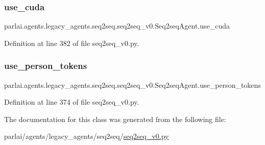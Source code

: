 \subsubsection{\texorpdfstring{use\+\_\+cuda}{use\_cuda}}
{\footnotesize\ttfamily parlai.\+agents.\+legacy\+\_\+agents.\+seq2seq.\+seq2seq\+\_\+v0.\+Seq2seq\+Agent.\+use\+\_\+cuda}



Definition at line 382 of file seq2seq\+\_\+v0.\+py.

\mbox{\label{classparlai_1_1agents_1_1legacy__agents_1_1seq2seq_1_1seq2seq__v0_1_1Seq2seqAgent_a227faa3994686ab266237ce9e11a2dc7}} 
\subsubsection{\texorpdfstring{use\+\_\+person\+\_\+tokens}{use\_person\_tokens}}
{\footnotesize\ttfamily parlai.\+agents.\+legacy\+\_\+agents.\+seq2seq.\+seq2seq\+\_\+v0.\+Seq2seq\+Agent.\+use\+\_\+person\+\_\+tokens}



Definition at line 374 of file seq2seq\+\_\+v0.\+py.



The documentation for this class was generated from the following file\+:\begin{DoxyCompactItemize}
\item 
parlai/agents/legacy\+\_\+agents/seq2seq/\hyperlink{seq2seq__v0_8py}{seq2seq\+\_\+v0.\+py}\end{DoxyCompactItemize}
